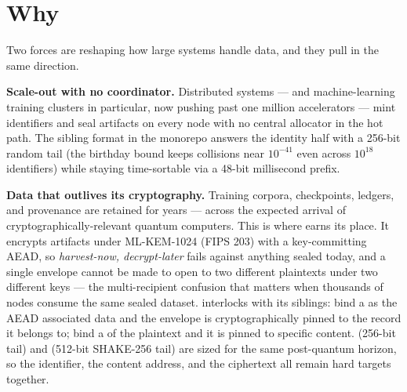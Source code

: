 \section{Why \pqcrypt{}}
\label{sec:why-seal}

Two forces are reshaping how large systems handle data, and they pull in the same direction.

\textbf{Scale-out with no coordinator.} Distributed systems --- and machine-learning training clusters in particular, now pushing past one million accelerators --- mint identifiers and seal artifacts on every node with no central allocator in the hot path. The \pqid{} sibling format in the \pqtoolkit{} monorepo answers the identity half with a 256-bit random tail (the birthday bound keeps collisions near $10^{-41}$ even across $10^{18}$ identifiers) while staying time-sortable via a 48-bit millisecond prefix.

\textbf{Data that outlives its cryptography.} Training corpora, checkpoints, ledgers, and provenance are retained for years --- across the expected arrival of cryptographically-relevant quantum computers. This is where \pqcrypt{} earns its place. It encrypts artifacts under ML-KEM-1024 (FIPS 203) with a key-committing AEAD, so \emph{harvest-now, decrypt-later} fails against anything sealed today, and a single envelope cannot be made to open to two different plaintexts under two different keys --- the multi-recipient confusion that matters when thousands of nodes consume the same sealed dataset. \pqcrypt{} interlocks with its siblings: bind a \pqid{} as the AEAD associated data and the envelope is cryptographically pinned to the record it belongs to; bind a \pqhash{} of the plaintext and it is pinned to specific content. \pqid{} (256-bit tail) and \pqhash{} (512-bit SHAKE-256 tail) are sized for the same post-quantum horizon, so the identifier, the content address, and the ciphertext all remain hard targets together.
